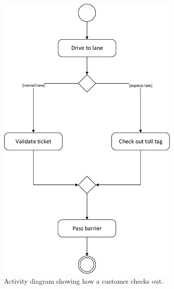 \begin{figure}[H]
	\centering
	\begin{subfigure}[b]{0.675\textwidth}
	\includegraphics[width=\textwidth]{img/activity_diagram/check_out}
	\caption{Activity diagram showing how a customer checks out.}
	\end{subfigure}
	~
	\begin{subfigure}[b]{0.225\textwidth}

\end{subfigure}
\end{figure}
